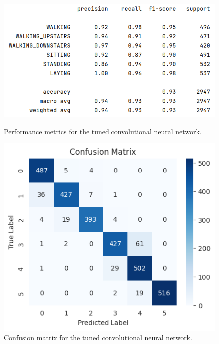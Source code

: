 \begin{figure}[ht]
    \centering
    \begin{minipage}{0.45\textwidth}
        \centering
        \includegraphics[width=\textwidth]{./img/cnn/tuned/performance-metrics}
        \caption{Performance metrics for the tuned convolutional neural network.}
        \label{fig:cnn-tuned-performance-metrics}
    \end{minipage}\hfill
    \begin{minipage}{0.45\textwidth}
        \centering
        \includegraphics[width=\textwidth]{./img/cnn/tuned/confusion-matrix}
        \caption{Confusion matrix for the tuned convolutional neural network.}
        \label{fig:cnn-tuned-confusion-matrix}
    \end{minipage}
\end{figure}


